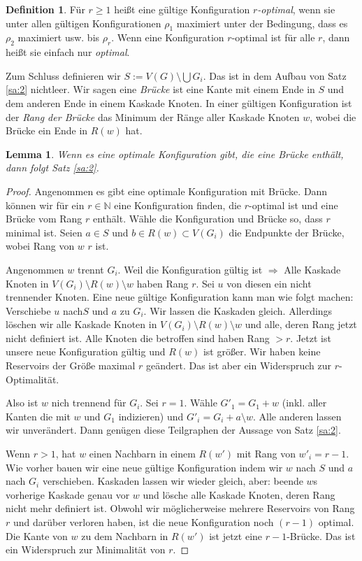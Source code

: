 \documentclass[12pt,a4paper]{scrartcl}
\numberwithin{equation}{section} %
\theoremstyle{definition}
\newtheorem{defn}[auf]{Definition}
\theoremstyle{plain}
\newtheorem{lem}[auf]{Lemma}
\newcommand{\nn}{\mathbb{N}}
\begin{document}
\begin{defn}
Für $r\ge 1$ heißt eine gültige Konfiguration \emph{$r$-optimal}, wenn sie unter allen gültigen Konfigurationen $\rho_1$ maximiert unter der Bedingung, dass es $\rho_2$ maximiert usw. bis $\rho_r$. Wenn eine Konfiguration $r$-optimal ist für alle $r$, dann heißt sie einfach nur \emph{optimal}. \par 
Zum Schluss definieren wir $S:=V(G)\setminus \bigcup G_i$. Das ist in dem Aufbau von Satz \ref{sa:2} nichtleer. Wir sagen eine \emph{Brücke} ist eine Kante mit einem Ende in $S$ und dem anderen Ende in einem Kaskade Knoten. In einer gültigen Konfiguration ist der \emph{Rang der Brücke} das Minimum der Ränge aller Kaskade Knoten $w$, wobei die Brücke ein Ende in $R(w)$ hat. 
\end{defn}

\begin{lem}
Wenn es eine optimale Konfiguration gibt, die eine Brücke enthält, dann folgt Satz \ref{sa:2}.
\label{lem:3}
\end{lem}
\begin{proof}
Angenommen es gibt eine optimale Konfiguration mit Brücke. Dann können wir für ein $r\in\nn$ eine Konfiguration finden, die $r$-optimal ist und eine Brücke vom Rang $r$ enthält. Wähle die Konfiguration und Brücke so, dass $r$ minimal ist. Seien $a\in S$ und $b\in R(w)\subset V(G_i)$ die Endpunkte der Brücke, wobei Rang von $w$ $r$ ist.\par
Angenommen $w$ trennt $G_i$. Weil die Konfiguration gültig ist $\Rightarrow$ Alle Kaskade Knoten in $V(G_i)\setminus R(w)\setminus w$ haben Rang $r$. Sei $u$ von diesen ein nicht trennender Knoten. Eine neue gültige Konfiguration kann man wie folgt machen: Verschiebe $u$ nach$S$ und $a$ zu $G_i$. Wir lassen die Kaskaden gleich. Allerdings löschen wir alle Kaskade Knoten in $V(G_i)\setminus R(w)\setminus w$  und alle, deren Rang jetzt nicht definiert ist. Alle Knoten die betroffen sind haben Rang $>r$. Jetzt ist unsere neue Konfiguration gültig und $R(w)$ ist größer. Wir haben keine Reservoirs der Größe maximal $r$ geändert. Das ist aber ein Widerspruch zur $r$-Optimalität.\par 
Also ist $w$ nich trennend für $G_i$. Sei $r=1$. Wähle $G'_1=G_1+w$ (inkl. aller Kanten die mit $w$ und $G_1$ indizieren) und $G'_i=G_i+a\setminus w$. Alle anderen lassen wir unverändert. Dann genügen diese Teilgraphen der Aussage von Satz \ref{sa:2}. \par 
Wenn $r>1$, hat $w$ einen Nachbarn in einem $R(w')$ mit Rang von $w'_i=r-1$. Wie vorher bauen wir eine neue gültige Konfiguration indem wir $w$ nach $S$ und $a$ nach $G_i$ verschieben. Kaskaden lassen wir wieder gleich, aber: beende $w$s vorherige Kaskade genau vor $w$ und lösche alle Kaskade Knoten, deren Rang nicht mehr definiert ist. Obwohl wir möglicherweise mehrere Reservoirs von Rang $r$ und darüber verloren haben, ist die neue Konfiguration noch $(r-1)$ optimal. Die Kante von $w$ zu dem Nachbarn in $R(w')$ ist jetzt eine $r-1$-Brücke. Das ist ein Widerspruch zur Minimalität von $r$.
\end{proof}
\end{document}
